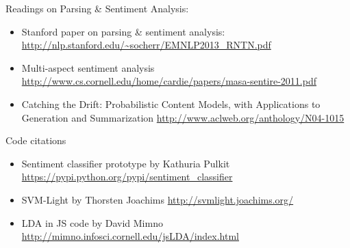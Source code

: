 \documentclass{article}
\begin{document}
Readings on Parsing \& Sentiment Analysis:
\begin{itemize}
\item Stanford paper on parsing \& sentiment analysis:
\newline
\url{http://nlp.stanford.edu/~socherr/EMNLP2013_RNTN.pdf}

\item Multi-aspect sentiment analysis
\newline 
\url{http://www.cs.cornell.edu/home/cardie/papers/masa-sentire-2011.pdf}

\item Catching the Drift: Probabilistic Content Models, with Applications to
Generation and Summarization \newline
\url{http://www.aclweb.org/anthology/N04-1015}

\end{itemize}

Code citations
\begin{itemize}
\item Sentiment classifier prototype by Kathuria Pulkit 
\newline
\url{https://pypi.python.org/pypi/sentiment_classifier}

\item SVM-Light by Thorsten Joachims
\newline
\url{http://svmlight.joachims.org/}

\item LDA in JS code by David Mimno
\newline
\url{http://mimno.infosci.cornell.edu/jsLDA/index.html}

\end{itemize}
\end{document}
